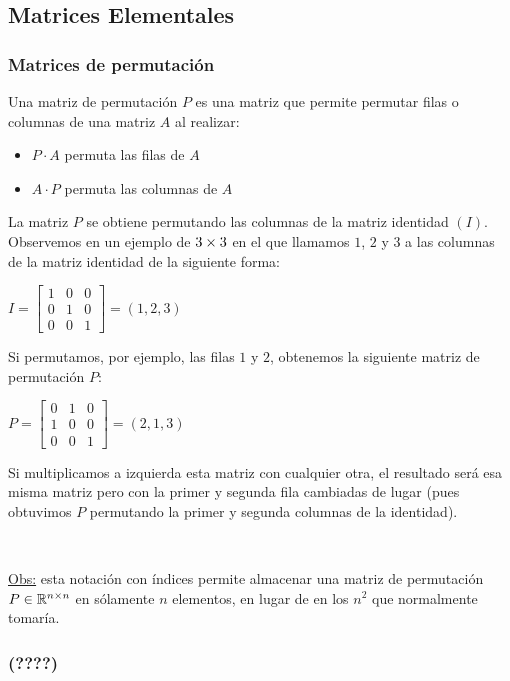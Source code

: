 \documentclass[]{article}
\begin{document}
\subsection{Matrices Elementales}
\subsubsection{Matrices de permutación}
Una matriz de permutación $P$ es una matriz que permite permutar filas o columnas de una matriz $A$ al realizar:
\begin{itemize}
	\item $P \cdot A$ permuta las filas de $A$
	\item $A \cdot P$ permuta las columnas de $A$
\end{itemize}

La matriz $P$ se obtiene permutando las columnas de la matriz identidad $(I)$. Observemos en un ejemplo de $3 \times 3$ en el que llamamos $1$, $2$ y $3$ a las columnas de la matriz identidad de la siguiente forma:
\begin{center}
	$I = \begin{bmatrix}
		1&0&0\\
		0&1&0\\
		0&0&1
	\end{bmatrix} = (1,2,3)$
\end{center}

Si permutamos, por ejemplo, las filas $1$ y $2$, obtenemos la siguiente matriz de permutación $P$:
\begin{center}
	$P=\begin{bmatrix}
		0&1&0\\
		1&0&0\\
		0&0&1
	\end{bmatrix} = (2,1,3)$
\end{center}

Si multiplicamos a izquierda esta matriz con cualquier otra, el resultado será esa misma matriz pero con la primer y segunda fila cambiadas de lugar (pues obtuvimos $P$ permutando la primer y segunda columnas de la identidad).

~\newline

\underline{Obs:} esta notación con índices permite almacenar una matriz de permutación $P\in\mathbb{R}^{n\times n}$ en sólamente $n$ elementos, en lugar de en los $n^2$ que normalmente tomaría.


\subsubsection{(????)}
\end{document}
